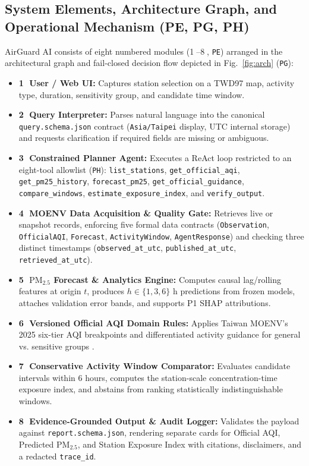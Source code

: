 \subsection{System Elements, Architecture Graph, and Operational Mechanism (PE, PG, PH)}
AirGuard AI consists of eight numbered modules (\textcircled{\scriptsize 1}--\textcircled{\scriptsize 8}, \texttt{PE}) arranged in the architectural graph and fail-closed decision flow depicted in Fig.~\ref{fig:arch} (\texttt{PG}):
\begin{itemize}
    \item \textbf{\textcircled{\scriptsize 1} User / Web UI:} Captures station selection on a TWD97 map, activity type, duration, sensitivity group, and candidate time window.
    \item \textbf{\textcircled{\scriptsize 2} Query Interpreter:} Parses natural language into the canonical \texttt{query.schema.json} contract (\texttt{Asia/Taipei} display, UTC internal storage) and requests clarification if required fields are missing or ambiguous.
    \item \textbf{\textcircled{\scriptsize 3} Constrained Planner Agent:} Executes a ReAct loop restricted to an eight-tool allowlist (\texttt{PH}): \texttt{list\_stations}, \texttt{get\_official\_aqi}, \texttt{get\_pm25\_history}, \texttt{forecast\_pm25}, \texttt{get\_official\_guidance}, \texttt{compare\_windows}, \texttt{estimate\_exposure\_index}, and \texttt{verify\_output}.
    \item \textbf{\textcircled{\scriptsize 4} MOENV Data Acquisition \& Quality Gate:} Retrieves live or snapshot records, enforcing five formal data contracts (\texttt{Observation}, \texttt{OfficialAQI}, \texttt{Forecast}, \texttt{ActivityWindow}, \texttt{AgentResponse}) and checking three distinct timestamps (\texttt{observed\_at\_utc}, \texttt{published\_at\_utc}, \texttt{retrieved\_at\_utc}).
    \item \textbf{\textcircled{\scriptsize 5} $\text{PM}_{2.5}$ Forecast \& Analytics Engine:} Computes causal lag/rolling features at origin $t$, produces $h \in \{1, 3, 6\}\text{ h}$ predictions from frozen models, attaches validation error bands, and supports P1 SHAP attributions.
    \item \textbf{\textcircled{\scriptsize 6} Versioned Official AQI Domain Rules:} Applies Taiwan MOENV's 2025 six-tier AQI breakpoints and differentiated activity guidance for general vs. sensitive groups \cite{moenv2025aqi}.
    \item \textbf{\textcircled{\scriptsize 7} Conservative Activity Window Comparator:} Evaluates candidate intervals within 6 hours, computes the station-scale concentration-time exposure index, and abstains from ranking statistically indistinguishable windows.
    \item \textbf{\textcircled{\scriptsize 8} Evidence-Grounded Output \& Audit Logger:} Validates the payload against \texttt{report.schema.json}, rendering separate cards for Official AQI, Predicted $\text{PM}_{2.5}$, and Station Exposure Index with citations, disclaimers, and a redacted \texttt{trace\_id}.
\end{itemize}

